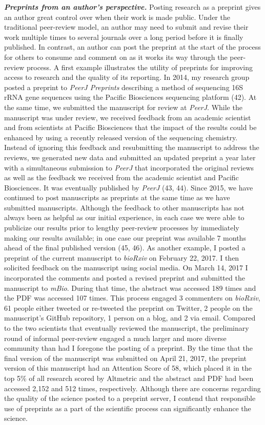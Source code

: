 \documentclass[11pt,]{article}
\begin{document}
\textbf{\emph{Preprints from an author's perspective.}} Posting research
as a preprint gives an author great control over when their work is made
public. Under the traditional peer-review model, an author may need to
submit and revise their work multiple times to several journals over a
long period before it is finally published. In contrast, an author can
post the preprint at the start of the process for others to consume and
comment on as it works its way through the peer-review process. A first
example illustrates the utility of preprints for improving access to
research and the quality of its reporting. In 2014, my research group
posted a preprint to \emph{PeerJ Preprints} describing a method of
sequencing 16S rRNA gene sequences using the Pacific Biosciences
sequencing platform (42). At the same time, we submitted the manuscript
for review at \emph{PeerJ}. While the manuscript was under review, we
received feedback from an academic scientist and from scientists at
Pacific Biosciences that the impact of the results could be enhanced by
using a recently released version of the sequencing chemistry. Instead
of ignoring this feedback and resubmitting the manuscript to address the
reviews, we generated new data and submitted an updated preprint a year
later with a simultaneous submission to \emph{PeerJ} that incorporated
the original reviews as well as the feedback we received from the
academic scientist and Pacific Biosciences. It was eventually published
by \emph{PeerJ} (43, 44). Since 2015, we have continued to post
manuscripts as preprints at the same time as we have submitted
manuscripts. Although the feedback to other manuscripts has not always
been as helpful as our initial experience, in each case we were able to
publicize our results prior to lengthy peer-review processes by
immediately making our results available; in one case our preprint was
available 7 months ahead of the final published version (45, 46). As
another example, I posted a preprint of the current manuscript to
\emph{bioRxiv} on February 22, 2017. I then solicited feedback on the
manuscript using social media. On March 14, 2017 I incorporated the
comments and posted a revised preprint and submitted the manuscript to
\emph{mBio}. During that time, the abstract was accessed 189 times and
the PDF was accessed 107 times. This process engaged 3 commenters on
\emph{bioRxiv}, 61 people either tweeted or re-tweeted the preprint on
Twitter, 2 people on the manuscript's GitHub repository, 1 person on a
blog, and 2 via email. Compared to the two scientists that eventually
reviewed the manuscript, the preliminary round of informal peer-review
engaged a much larger and more diverse community than had I foregone the
posting of a preprint. By the time that the final version of the
manuscript was submitted on April 21, 2017, the preprint version of this
manuscript had an Attention Score of 58, which placed it in the top 5\%
of all research scored by Altmetric and the abstract and PDF had been
accessed 2,152 and 512 times, respectively. Although there are concerns
regarding the quality of the science posted to a preprint server, I
contend that responsible use of preprints as a part of the scientific
process can significantly enhance the science.
\end{document}

